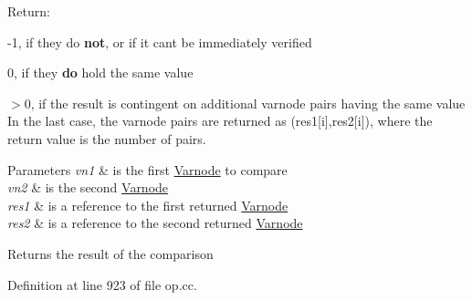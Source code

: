 Return\+:
\begin{DoxyItemize}
\item -\/1, if they do {\bfseries{not}}, or if it can\textquotesingle{}t be immediately verified
\item 0, if they {\bfseries{do}} hold the same value
\item $>$0, if the result is contingent on additional varnode pairs having the same value In the last case, the varnode pairs are returned as (res1\mbox{[}i\mbox{]},res2\mbox{[}i\mbox{]}), where the return value is the number of pairs. 
\begin{DoxyParams}{Parameters}
{\em vn1} & is the first \mbox{\hyperlink{class_varnode}{Varnode}} to compare \\
\hline
{\em vn2} & is the second \mbox{\hyperlink{class_varnode}{Varnode}} \\
\hline
{\em res1} & is a reference to the first returned \mbox{\hyperlink{class_varnode}{Varnode}} \\
\hline
{\em res2} & is a reference to the second returned \mbox{\hyperlink{class_varnode}{Varnode}} \\
\hline
\end{DoxyParams}
\begin{DoxyReturn}{Returns}
the result of the comparison 
\end{DoxyReturn}

\end{DoxyItemize}

Definition at line 923 of file op.\+cc.

